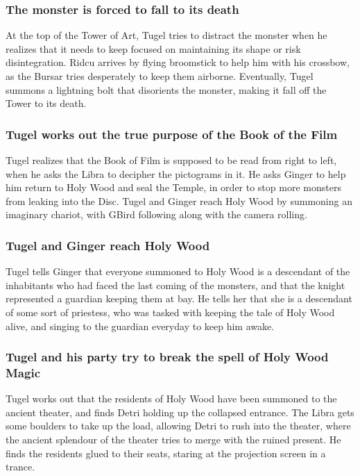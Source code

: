 \subsubsection{The monster is forced to fall to its death}
At the top of the Tower of Art, \Gls{Tugel} tries to distract the monster when he realizes that it
needs to keep focused on maintaining its shape or risk disintegration. \Gls{Ridcu} arrives by
flying broomstick to help him with his crossbow, as the \Gls{Bursar} tries desperately to keep them
airborne. Eventually, \Gls{Tugel} summons a lightning bolt that disorients the monster, making it
fall off the Tower to its death.

\subsubsection{\Gls{Tugel} works out the true purpose of the Book of the Film}
\Gls{Tugel} realizes that the Book of Film is supposed to be read from right to left, when he asks
the \Gls{Libra} to decipher the pictograms in it. He asks \Gls{Ginger} to help him return to Holy
Wood and seal the Temple, in order to stop more monsters from leaking into the Disc. \Gls{Tugel}
and \Gls{Ginger} reach Holy Wood by summoning an imaginary chariot, with \Gls{GBird} following along
with the camera rolling.

\subsubsection{\Gls{Tugel} and \Gls{Ginger} reach Holy Wood}
\Gls{Tugel} tells \Gls{Ginger} that everyone summoned to Holy Wood is a descendant of the
inhabitants who had faced the last coming of the monsters, and that the knight represented a
guardian keeping them at bay. He tells her that she is a descendant of some sort of priestess, who
was tasked with keeping the tale of Holy Wood alive, and singing to the guardian everyday to keep
him awake.

\subsubsection{\Gls{Tugel} and his party try to break the spell of Holy Wood Magic}
\Gls{Tugel} works out that the residents of Holy Wood have been summoned to the ancient theater, and
finds \Gls{Detri} holding up the collapsed entrance. The \Gls{Libra} gets some boulders to take up
the load, allowing \Gls{Detri} to rush into the theater, where the ancient splendour of the theater
tries to merge with the ruined present. He finds the residents glued to their seats, staring at the
projection screen in a trance.

